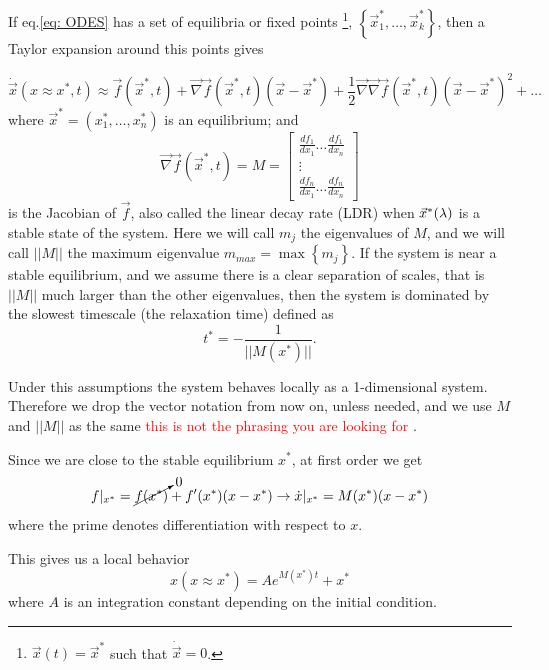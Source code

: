 If eq.\eqref{eq: ODES} has a set of equilibria or fixed points \footnote{ $\vec{x}(t)=\vec{x}^*$ such that $\dot{\vec{x}}=0$.  }, $ \left\lbrace \vec{x}^*_1,\dots, \vec{x}^*_k \right\rbrace $, then a Taylor expansion around this points gives 

\begin{equation}
\dot{\vec x}(x\approx x^*,t)\approx \vec f(\vec{x}^*,t)+ \vec{\nabla}  \vec f(\vec{x}^*,t)(\vec{x}-\vec{x}^*)+ \frac{1}{2} \vec{\nabla} \vec{\nabla} \vec f(\vec{x}^*,t)(\vec{x}-\vec{x}^*)^2+\dots 
\label{eq: EWS_taylor}
\end{equation}
where $\vec{x}^*=(x^*_1,\dots,x^*_n)$ is an equilibrium; and  
\begin{equation}
	\vec{\nabla}  \vec f(\vec x^*,t)=M=
	\begin{bmatrix}
		\frac{d f_1}{d x_1}\hdots \frac{d f_1}{d x_n}  \\
		\vdots \\
		\frac{d f_n}{d x_1}\hdots \frac{d f_n}{d x_n}
	\end{bmatrix}
\end{equation}
is the Jacobian of $\vec f$, also called   the linear decay rate (LDR) when $\vec{x}^*(\lambda)$ is a stable state of the system.
Here we will call $m_j$ the eigenvalues of $M$, and we will call $||M||$  the maximum eigenvalue $m_{max}=\max \left\lbrace m_j \right\rbrace $.
If the system is near a stable equilibrium, and we assume there is a clear separation of scales, that is $||M||$ much larger than the other eigenvalues, then the system is dominated by the slowest timescale (the relaxation time) defined as   
\begin{equation}
	t^*=-\frac{1}{||M(x^*)||}.
\end{equation}

Under this assumptions the system behaves locally as a 1-dimensional system. Therefore we drop the vector notation from now on, unless needed, and we use $M$ and $||M||$ as the same \textcolor{red}{this is not the phrasing you are looking for} .

Since we are close to the stable equilibrium $x^*$, at first order we get 
\begin{equation}
	f|_{x^*}=\cancelto{0}{f(x^*)}+f'(x^*)(x-x^*) \rightarrow \dot{x}|_{x^*}=M(x^*)(x-x^*)
\end{equation}
where the prime denotes differentiation with respect to $x$.

This gives us a local behavior  
\begin{equation}
	x(x\approx x^*)=A e^{M(x^*)t}+x^*
\end{equation}
where $A$ is an integration constant depending on the initial condition. 

